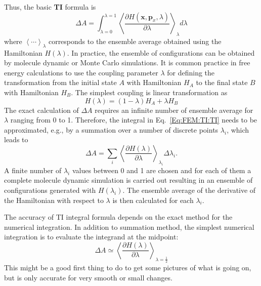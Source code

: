 Thus, the basic \textbf{TI} formula is
\begin{equation}
\Delta A = \int_{\lambda=0}^{\lambda=1}\left \langle \frac{\partial{H(\textbf{x},\textbf{p}_{x},\lambda)}}{\partial{\lambda}} \right \rangle_{\lambda} d\lambda
\label{Eq:FEM:TI:TI}
\end{equation} 
where $\left \langle \cdots \right \rangle _{\lambda}$ corresponds to the ensemble average obtained using the Hamiltonian $H(\lambda)$. In practice, the ensemble of configurations can be obtained by molecule dynamic or Monte Carlo simulations. It is common practice in free energy calculations to use the coupling parameter $\lambda$ for defining the transformation from the initial state $A$ with Hamiltonian $H_{A}$ to the final state $B$ with Hamiltonian $H_{B}$. The simplest coupling is linear transformation as
\begin{equation}
H(\lambda) = (1-\lambda) H_{A} + \lambda H_{B}
\end{equation}
The exact calculation of $\Delta A$ requires an infinite number of ensemble average for $\lambda$ ranging from 0 to 1.
Therefore, the integral in Eq.~\ref{Eq:FEM:TI:TI} needs to be approximated, e.g., by a summation over a number of discrete points $\lambda_{i}$, which leads to 
\begin{equation}
\Delta A = \sum_{i}^{}\left \langle \frac{\partial{H(\lambda)}}{\partial{\lambda}} \right \rangle_{\lambda_{i}} \Delta\lambda_{i}.
\label{Eq:FEM:TI:dTI}
\end{equation} 
A finite number of $\lambda_{i}$ values between 0 and 1 are chosen and for each of them a complete molecule dynamic simulation is carried out resulting in an ensemble of configurations generated with $H(\lambda_{i})$.
The ensemble average of the derivative of the Hamiltonian with respect to $\lambda$ is then calculated for each $\lambda_{i}$.
	
The accuracy of TI integral formula depends on the exact method for the numerical integration.\cite{PaliwalJCTC2011} In addition to summation method, the simplest numerical integration is to evaluate the integrand at the midpoint:
\begin{equation}
\Delta A \simeq \left \langle \frac{\partial{H(\lambda)}}{\partial{\lambda}} \right \rangle_{\lambda=\frac{1}{2}}
\label{Eq:FEM:TI:TI1}
\end{equation} 
This might be a good first thing to do to get some pictures of what is going on, but is only accurate for very smooth or small changes. %
	
